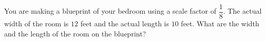 You are making a blueprint of your bedroom using a scale factor of $\dfrac18$. The actual width of the room is $12$ feet and the actual length is $10$ feet. What are the width and the length of the room on the blueprint?

